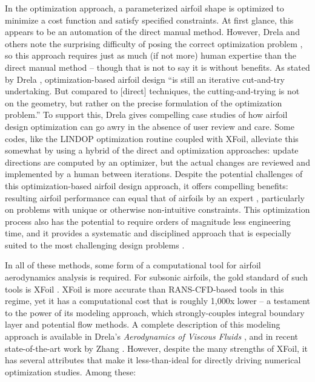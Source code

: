 \documentclass[conf]{new-aiaa}
\begin{document}
    In the optimization approach, a parameterized airfoil shape is optimized to minimize a cost function and satisfy specified constraints. At first glance, this appears to be an automation of the direct manual method. However, Drela and others note the surprising difficulty of posing the correct optimization problem \cite{drela_pros_1998, kroo_multidisciplinary_1997}, so this approach requires just as much (if not more) human expertise than the direct manual method -- though that is not to say it is without benefits. As stated by Drela \cite{drela_pros_1998}, optimization-based airfoil design ``is still an iterative cut-and-try undertaking. But compared to [direct] techniques, the cutting-and-trying is not on the geometry, but rather on the precise formulation of the optimization problem.'' To support this, Drela gives compelling case studies of how airfoil design optimization can go awry in the absence of user review and care. Some codes, like the LINDOP \cite{mses} optimization routine coupled with XFoil, alleviate this somewhat by using a hybrid of the direct and optimization approaches: update directions are computed by an optimizer, but the actual changes are reviewed and implemented by a human between iterations. Despite the potential challenges of this optimization-based airfoil design approach, it offers compelling benefits: resulting airfoil performance can equal that of airfoils by an expert \cite{drela_pros_1998}, particularly on problems with unique or otherwise non-intuitive constraints. This optimization process also has the potential to require orders of magnitude less engineering time, and it provides a systematic and disciplined approach that is especially suited to the most challenging design problems \cite{he2019robust}.

    In all of these methods, some form of a computational tool for airfoil aerodynamics analysis is required. For subsonic airfoils, the gold standard of such tools is XFoil \cite{drela_xfoil_1989}. XFoil is more accurate than RANS-CFD-based tools \cite{morgado2016xfoil} in this regime, yet it has a computational cost that is roughly 1,000x lower -- a testament to the power of its modeling approach, which strongly-couples integral boundary layer and potential flow methods. A complete description of this modeling approach is available in Drela's \textit{Aerodynamics of Viscous Fluids} \cite{drela_aerodynamics_2019}, and in recent state-of-the-art work by Zhang \cite{zhang_threedimensional_2022, zhang_nonparametric_2017}. However, despite the many strengths of XFoil, it has several attributes that make it less-than-ideal for directly driving numerical optimization studies. Among these:
\end{document}
